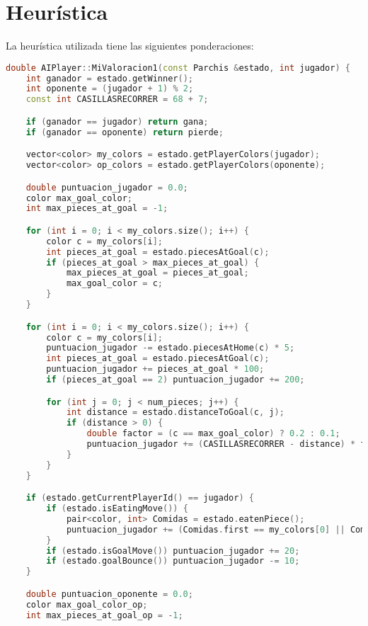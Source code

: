 \documentclass[a4paper, 11pt]{article}
\begin{document}
\section{Heurística}

La heurística utilizada tiene las siguientes ponderaciones:

\begin{lstlisting}[language=C++]
double AIPlayer::MiValoracion1(const Parchis &estado, int jugador) {
    int ganador = estado.getWinner();
    int oponente = (jugador + 1) % 2;
    const int CASILLASRECORRER = 68 + 7; 

    if (ganador == jugador) return gana; 
    if (ganador == oponente) return pierde; 

    vector<color> my_colors = estado.getPlayerColors(jugador);
    vector<color> op_colors = estado.getPlayerColors(oponente);

    double puntuacion_jugador = 0.0;
    color max_goal_color;
    int max_pieces_at_goal = -1;

    for (int i = 0; i < my_colors.size(); i++) {
        color c = my_colors[i];
        int pieces_at_goal = estado.piecesAtGoal(c);
        if (pieces_at_goal > max_pieces_at_goal) {
            max_pieces_at_goal = pieces_at_goal;
            max_goal_color = c;
        }
    }

    for (int i = 0; i < my_colors.size(); i++) {
        color c = my_colors[i];
        puntuacion_jugador -= estado.piecesAtHome(c) * 5;
        int pieces_at_goal = estado.piecesAtGoal(c);
        puntuacion_jugador += pieces_at_goal * 100;
        if (pieces_at_goal == 2) puntuacion_jugador += 200; 

        for (int j = 0; j < num_pieces; j++) {
            int distance = estado.distanceToGoal(c, j);
            if (distance > 0) {
                double factor = (c == max_goal_color) ? 0.2 : 0.1; 
                puntuacion_jugador += (CASILLASRECORRER - distance) * factor;
            }
        }
    }

    if (estado.getCurrentPlayerId() == jugador) {
        if (estado.isEatingMove()) {
            pair<color, int> Comidas = estado.eatenPiece();
            puntuacion_jugador += (Comidas.first == my_colors[0] || Comidas.first == my_colors[1]) ? 10 : 50;
        }
        if (estado.isGoalMove()) puntuacion_jugador += 20;
        if (estado.goalBounce()) puntuacion_jugador -= 10; 
    }

    double puntuacion_oponente = 0.0;
    color max_goal_color_op;
    int max_pieces_at_goal_op = -1;


\end{lstlisting}
\end{document}

